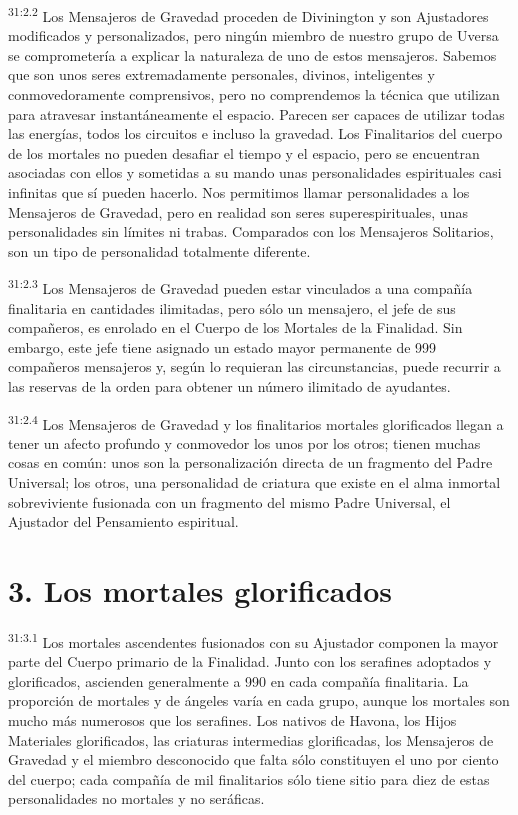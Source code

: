 \par
\textsuperscript{31:2.2} Los Mensajeros de Gravedad proceden de Divinington y son Ajustadores modificados y personalizados, pero ningún miembro de nuestro grupo de Uversa se comprometería a explicar la naturaleza de uno de estos mensajeros. Sabemos que son unos seres extremadamente personales, divinos, inteligentes y conmovedoramente comprensivos, pero no comprendemos la técnica que utilizan para atravesar instantáneamente el espacio. Parecen ser capaces de utilizar todas las energías, todos los circuitos e incluso la gravedad. Los Finalitarios del cuerpo de los mortales no pueden desafiar el tiempo y el espacio, pero se encuentran asociadas con ellos y sometidas a su mando unas personalidades espirituales casi infinitas que sí pueden hacerlo. Nos permitimos llamar personalidades a los Mensajeros de Gravedad, pero en realidad son seres superespirituales, unas personalidades sin límites ni trabas. Comparados con los Mensajeros Solitarios, son un tipo de personalidad totalmente diferente.

\par
\textsuperscript{31:2.3} Los Mensajeros de Gravedad pueden estar vinculados a una compañía finalitaria en cantidades ilimitadas, pero sólo un mensajero, el jefe de sus compañeros, es enrolado en el Cuerpo de los Mortales de la Finalidad. Sin embargo, este jefe tiene asignado un estado mayor permanente de 999 compañeros mensajeros y, según lo requieran las circunstancias, puede recurrir a las reservas de la orden para obtener un número ilimitado de ayudantes.

\par
\textsuperscript{31:2.4} Los Mensajeros de Gravedad y los finalitarios mortales glorificados llegan a tener un afecto profundo y conmovedor los unos por los otros; tienen muchas cosas en común: unos son la personalización directa de un fragmento del Padre Universal; los otros, una personalidad de criatura que existe en el alma inmortal sobreviviente fusionada con un fragmento del mismo Padre Universal, el Ajustador del Pensamiento espiritual.

\section*{3. Los mortales glorificados}
\par
\textsuperscript{31:3.1} Los mortales ascendentes fusionados con su Ajustador componen la mayor parte del Cuerpo primario de la Finalidad. Junto con los serafines adoptados y glorificados, ascienden generalmente a 990 en cada compañía finalitaria. La proporción de mortales y de ángeles varía en cada grupo, aunque los mortales son mucho más numerosos que los serafines. Los nativos de Havona, los Hijos Materiales glorificados, las criaturas intermedias glorificadas, los Mensajeros de Gravedad y el miembro desconocido que falta sólo constituyen el uno por ciento del cuerpo; cada compañía de mil finalitarios sólo tiene sitio para diez de estas personalidades no mortales y no seráficas.

